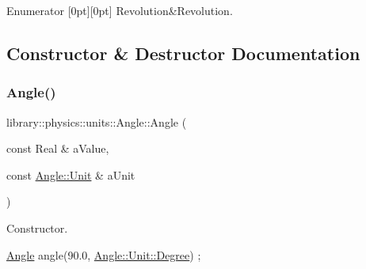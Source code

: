 \begin{DoxyEnumFields}{Enumerator}
[0pt][0pt]{}\mbox{\label{classlibrary_1_1physics_1_1units_1_1_angle_a3c329d415a61783b16ce481874cc5956aad09b2d48b2811c68e5a2bf421f7f2f2}} 
Revolution&Revolution. \\
\hline

\end{DoxyEnumFields}


\subsection{Constructor \& Destructor Documentation}
\mbox{\label{classlibrary_1_1physics_1_1units_1_1_angle_a6cd94e306cdc3a15fe13135729299d99}} 
\subsubsection{\texorpdfstring{Angle()}{Angle()}\hspace{0.1cm}{\footnotesize\ttfamily [1/2]}}
{\footnotesize\ttfamily library\+::physics\+::units\+::\+Angle\+::\+Angle (\begin{DoxyParamCaption}\item[{const Real \&}]{a\+Value,  }\item[{const \hyperlink{classlibrary_1_1physics_1_1units_1_1_angle_a3c329d415a61783b16ce481874cc5956}{Angle\+::\+Unit} \&}]{a\+Unit }\end{DoxyParamCaption})}



Constructor. 


\begin{DoxyCode}
\hyperlink{classlibrary_1_1physics_1_1units_1_1_angle_a6cd94e306cdc3a15fe13135729299d99}{Angle} angle(90.0, \hyperlink{classlibrary_1_1physics_1_1units_1_1_angle_a3c329d415a61783b16ce481874cc5956a6669c4dc00cb161446821b3529ca07d8}{Angle::Unit::Degree}) ;
\end{DoxyCode}



